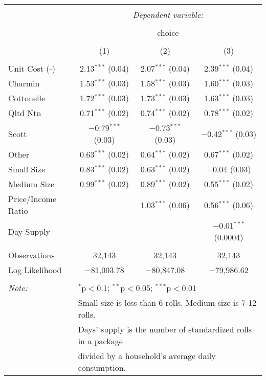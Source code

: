 
\begin{table}[!htbp] \centering 
  \caption{} 
  \label{tab:mnlLABaseline} 
\begin{tabular}{@{\extracolsep{5pt}}lccc} 
\\[-1.8ex]\hline 
\hline \\[-1.8ex] 
 & \multicolumn{3}{c}{\textit{Dependent variable:}} \\ 
\cline{2-4} 
\\[-1.8ex] & \multicolumn{3}{c}{choice} \\ 
\\[-1.8ex] & (1) & (2) & (3)\\ 
\hline \\[-1.8ex] 
 Unit Cost (-) & 2.13$^{***}$ (0.04) & 2.07$^{***}$ (0.04) & 2.39$^{***}$ (0.04) \\ 
  Charmin & 1.53$^{***}$ (0.03) & 1.58$^{***}$ (0.03) & 1.60$^{***}$ (0.03) \\ 
  Cottonelle & 1.72$^{***}$ (0.03) & 1.73$^{***}$ (0.03) & 1.63$^{***}$ (0.03) \\ 
  Qltd Ntn & 0.71$^{***}$ (0.02) & 0.74$^{***}$ (0.02) & 0.78$^{***}$ (0.02) \\ 
  Scott & $-$0.79$^{***}$ (0.03) & $-$0.73$^{***}$ (0.03) & $-$0.42$^{***}$ (0.03) \\ 
  Other & 0.63$^{***}$ (0.02) & 0.64$^{***}$ (0.02) & 0.67$^{***}$ (0.02) \\ 
  Small Size & 0.83$^{***}$ (0.02) & 0.63$^{***}$ (0.02) & $-$0.04 (0.03) \\ 
  Medium Size & 0.99$^{***}$ (0.02) & 0.89$^{***}$ (0.02) & 0.55$^{***}$ (0.02) \\ 
  Price/Income Ratio &  & 1.03$^{***}$ (0.06) & 0.56$^{***}$ (0.06) \\ 
  Day Supply &  &  & $-$0.01$^{***}$ (0.0004) \\ 
 \hline \\[-1.8ex] 
Observations & 32,143 & 32,143 & 32,143 \\ 
Log Likelihood & $-$81,003.78 & $-$80,847.08 & $-$79,986.62 \\ 
\hline 
\hline \\[-1.8ex] 
\textit{Note:}  & \multicolumn{3}{l}{$^{*}$p$<$0.1; $^{**}$p$<$0.05; $^{***}$p$<$0.01} \\ 
 & \multicolumn{3}{l}{Small size is less than 6 rolls. Medium size is 7-12 rolls. } \\ 
 & \multicolumn{3}{l}{Days' supply is the number of standardized rolls in a package} \\ 
 & \multicolumn{3}{l}{divided by a household's average daily consumption.} \\ 
\end{tabular} 
\end{table} 
